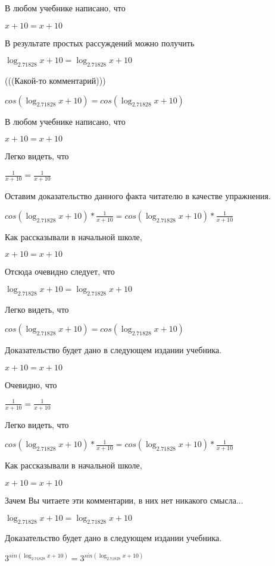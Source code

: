 \documentclass[12pt,a4paper,fleqn]{article}
\theoremstyle{definition}
\begin{document}
В любом учебнике написано, что

$ x  +  10  =  x  +  10 $

В результате простых рассуждений можно получить

$\log_{ 2.71828 }{ x  +  10 } = \log_{ 2.71828 }{ x  +  10 }$

(((Какой-то комментарий)))

$cos(\log_{ 2.71828 }{ x  +  10 }) = cos(\log_{ 2.71828 }{ x  +  10 })$

В любом учебнике написано, что

$ x  +  10  =  x  +  10 $

Легко видеть, что

$\frac{ 1 }{ x  +  10 }
 = \frac{ 1 }{ x  +  10 }
$

Оставим доказательство данного факта читателю в качестве упражнения.

$cos(\log_{ 2.71828 }{ x  +  10 }) * \frac{ 1 }{ x  +  10 }
 = cos(\log_{ 2.71828 }{ x  +  10 }) * \frac{ 1 }{ x  +  10 }
$

Как рассказывали в начальной школе,

$ x  +  10  =  x  +  10 $

Отсюда очевидно следует, что

$\log_{ 2.71828 }{ x  +  10 } = \log_{ 2.71828 }{ x  +  10 }$

Легко видеть, что

$cos(\log_{ 2.71828 }{ x  +  10 }) = cos(\log_{ 2.71828 }{ x  +  10 })$

Доказательство будет дано в следующем издании учебника.

$ x  +  10  =  x  +  10 $

Очевидно, что

$\frac{ 1 }{ x  +  10 }
 = \frac{ 1 }{ x  +  10 }
$

Легко видеть, что

$cos(\log_{ 2.71828 }{ x  +  10 }) * \frac{ 1 }{ x  +  10 }
 = cos(\log_{ 2.71828 }{ x  +  10 }) * \frac{ 1 }{ x  +  10 }
$

Как рассказывали в начальной школе,

$ x  +  10  =  x  +  10 $

Зачем Вы читаете эти комментарии, в них нет никакого смысла...

$\log_{ 2.71828 }{ x  +  10 } = \log_{ 2.71828 }{ x  +  10 }$

Доказательство будет дано в следующем издании учебника.

${ 3 }^{sin(\log_{ 2.71828 }{ x  +  10 })} = { 3 }^{sin(\log_{ 2.71828 }{ x  +  10 })}$
\end{document}

